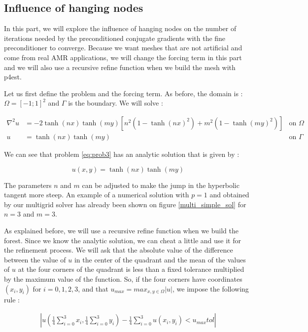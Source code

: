 \subsection{Influence of hanging nodes}
 In this part, we will explore the influence of hanging nodes on the number of iterations needed by the preconditioned conjugate gradients with the fine preconditioner to converge. Because we want meshes that are not artificial and come from real AMR applications, we will change the forcing term in this part and we will also use a recursive refine function when we build the mesh with p4est. 
 
 Let us first define the problem and the forcing term. As before, the domain is : $\Omega = [-1;1]^2$ and $\Gamma$ is the boundary. We will solve : 
 
 \begin{align}
 \nabla^2 u &= -2\tanh(nx)\tanh(my)\left[ n^2(1-\tanh(nx)^2) + m^2(1-\tanh(my)^2)\right] &\text{on $\Omega$} \label{eq:prob3}\\
u &= \tanh(nx)\tanh(my)  &\text{on $\Gamma$}
 \end{align}
 
 We can see that problem \ref{eq:prob3} has an analytic solution that is given by :
 
 $$u(x,y) = \tanh(nx)\tanh(my)$$
 
 The parameters $n$ and $m$ can be adjusted to make the jump in the hyperbolic tangent more steep. An example of a numerical solution with $p=1$ and obtained by our multigrid solver has already been shown on figure \ref{multi_simple_sol} for $n=3$ and $m=3$. 
 
 As explained before, we will use a recursive refine function when we build the forest. Since we know the analytic solution, we can cheat a little and use it for the refinement process. We will ask that the absolute value of the difference between the value of $u$ in the center of the quadrant and the mean of the values of $u$ at the four corners of the quadrant is less than a fixed tolerance multiplied by the maximum value of the function. So, if the four corners have coordinates $(x_i , y_i)$ for $i=0,1,2,3$, and that $u_{max} = max_{x,y \in \Omega} \left| u \right|$, we impose the following rule :
 
\begin{align}  
  \left| u(\frac{1}{4}\sum_{i=0}^3 x_i , \frac{1}{4}\sum_{i=0}^3 y_i) - \frac{1}{4}\sum_{i=0}^3 u(x_i,y_i) < u_{max} tol\right|
  \label{hang_rel}
\end{align}
  
